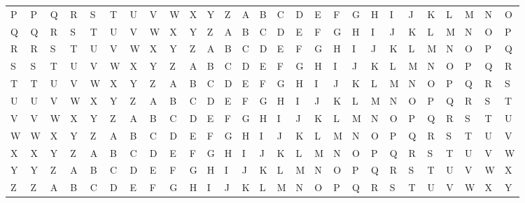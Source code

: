 \documentclass[10pt]{article}
\begin{document}
{\begin{tabular}{l| l l l l l l l l l l l l l l l l l l l l l l l l l l}
P & P & Q & R & S & T & U & V & W & X & Y & Z & A & B & C & D & E & F & G & H & I & J & K & L & M & N & O\\
Q & Q & R & S & T & U & V & W & X & Y & Z & A & B & C & D & E & F & G & H & I & J & K & L & M & N & O & P\\
R & R & S & T & U & V & W & X & Y & Z & A & B & C & D & E & F & G & H & I & J & K & L & M & N & O & P & Q\\
S & S & T & U & V & W & X & Y & Z & A & B & C & D & E & F & G & H & I & J & K & L & M & N & O & P & Q & R\\
T & T & U & V & W & X & Y & Z & A & B & C & D & E & F & G & H & I & J & K & L & M & N & O & P & Q & R & S\\
U & U & V & W & X & Y & Z & A & B & C & D & E & F & G & H & I & J & K & L & M & N & O & P & Q & R & S & T\\
V & V & W & X & Y & Z & A & B & C & D & E & F & G & H & I & J & K & L & M & N & O & P & Q & R & S & T & U\\
W & W & X & Y & Z & A & B & C & D & E & F & G & H & I & J & K & L & M & N & O & P & Q & R & S & T & U & V\\
X & X & Y & Z & A & B & C & D & E & F & G & H & I & J & K & L & M & N & O & P & Q & R & S & T & U & V & W\\
Y & Y & Z & A & B & C & D & E & F & G & H & I & J & K & L & M & N & O & P & Q & R & S & T & U & V & W & X\\
Z & Z & A & B & C & D & E & F & G & H & I & J & K & L & M & N & O & P & Q & R & S & T & U & V & W & X & Y\\
\end{tabular}
}
\end{document}
